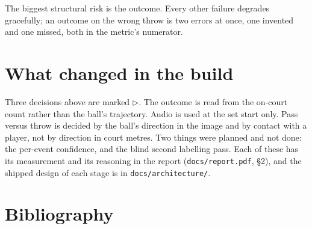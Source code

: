 \documentclass[10pt,a4paper]{article}
\begin{document}
The biggest structural risk is the outcome. Every other failure degrades gracefully; an
outcome on the wrong throw is two errors at once, one invented and one missed, both in the
metric's numerator.

\section{What changed in the build}
\label{sec:changed}

Three decisions above are marked
\textcolor{accent!88!black}{$\triangleright$}. The outcome is read from the on-court count
rather than the ball's trajectory. Audio is used at the set start only. Pass versus throw is
decided by the ball's direction in the image and by contact with a player, not by direction
in court metres. Two things were planned and not done: the per-event confidence, and the
blind second labelling pass. Each of these has its measurement and its reasoning in the
report (\texttt{docs/report.pdf}, \S2), and the shipped design of each stage is in \texttt{docs/architecture/}.

\section*{Bibliography}
\end{document}
